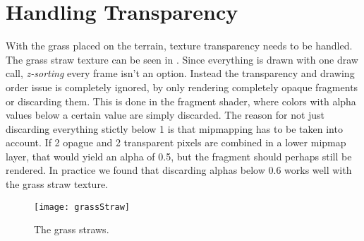 \section{Handling Transparency}\label{sec:transparency}


With the grass placed on the terrain, texture transparency needs to be
handled. The grass straw texture can be seen in
. Since everything is drawn with one draw
call, \emph{z-sorting} every frame isn't an option. Instead the transparency
and drawing order issue is completely ignored, by only rendering
completely opaque fragments or discarding them. This is done in the
fragment shader, where colors with alpha values below a certain value
are simply discarded. The reason for not just discarding everything
stictly below 1 is that mipmapping has to be taken into account. If 2
opague and 2 transparent pixels are combined in a lower mipmap layer,
that would yield an alpha of 0.5, but the fragment should perhaps
still be rendered. In practice we found that discarding alphas below
0.6 works well with the grass straw texture.

\begin{figure}
  \centering
  \texttt{[image: grassStraw]}
  \caption{The grass straws.}
  \label{fig:grassStraws}
\end{figure}


